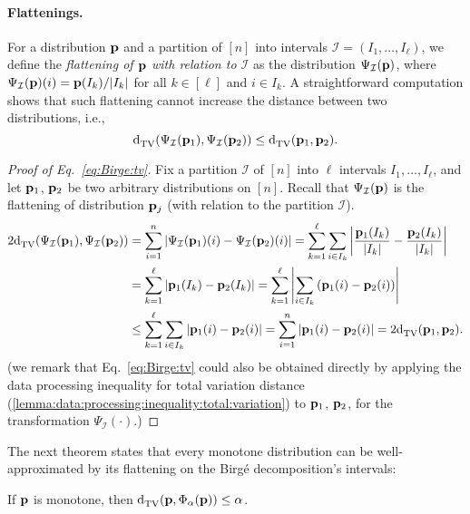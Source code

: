 \paragraph{Flattenings.}
\noindent For a distribution $\D$ and a partition of $[n]$ into intervals $\mathcal{I}=(I_1,\dots,I_\ell)$, we define the \emph{flattening of $\D$ with relation to $\mathcal{I}$} as the distribution $\Psi_{\mathcal{I}}(\D)$, where $\Psi_{\mathcal{I}}(\D)(i) = {\D(I_k)}/{\abs{I_k}}$ for all $k\in [\ell]$ and $i\in I_k$. A straightforward computation shows that such flattening cannot increase the distance between two distributions, i.e.,
  \begin{equation}\label{eq:Birge:tv}
      \totalvardist{ \Psi_{\mathcal{I}}(\D_1) }{ \Psi_{\mathcal{I}}(\D_2) } \leq \totalvardist{\D_1}{\D_2}.
  \end{equation}
\begin{proof}[Proof of Eq.~\eqref{eq:Birge:tv}]
    Fix a partition $\mathcal{I}$ of $[n]$ into $\ell$ intervals $I_1,\dots, I_\ell$, and let $\D_1$, $\D_2$ be two arbitrary distributions on $[n]$. Recall that $\Psi_{\mathcal{I}}(\D)$ is the flattening of distribution $\D_j$ (with relation to the partition $\mathcal{I}$).
      \begin{align*}
      2\totalvardist{ \Psi_{\mathcal{I}}(\D_1) }{ \Psi_{\mathcal{I}}(\D_2) } &= \sum_{i=1}^n \abs{ \Psi_{\mathcal{I}}(\D_1)(i) - \Psi_{\mathcal{I}}(\D_2)(i) } = \sum_{k=1}^\ell \sum_{i\in I_k} \abs{ \frac{\D_1(I_k)}{\abs{I_k}} - \frac{\D_2(I_k)}{\abs{I_k}} } \\
      &=  \sum_{k=1}^\ell \abs{ \D_1(I_k) - \D_2(I_k) } = \sum_{k=1}^\ell \abs{ \sum_{i\in I_k}\left( \D_1(i) - \D_2(i) \right) } \\
      &\leq  \sum_{k=1}^\ell \sum_{i\in I_k} \abs{ \D_1(i) - \D_2(i)  } = \sum_{i=1}^n \abs{ \D_1(i) - \D_2(i)  } 
      = 2\totalvardist{\D_1}{\D_2}.
      \end{align*}
(we remark that Eq.~\eqref{eq:Birge:tv} could also be obtained directly by applying the data processing inequality for total variation distance (\cref{lemma:data:processing:inequality:total:variation}) to $\D_1$, $\D_2$, for the transformation $\Psi_{\mathcal{I}}(\cdot)$.)
\end{proof}

The next theorem states that every monotone distribution can be well-approximated by its flattening on the Birg\'e decomposition's intervals:     
\begin{theorem}\label{theorem:Birge:obl:decomp}
 If $\D$ is monotone, then $\totalvardist{\D}{\birge[\D]{\alpha}} \leq \alpha$.
\end{theorem}

